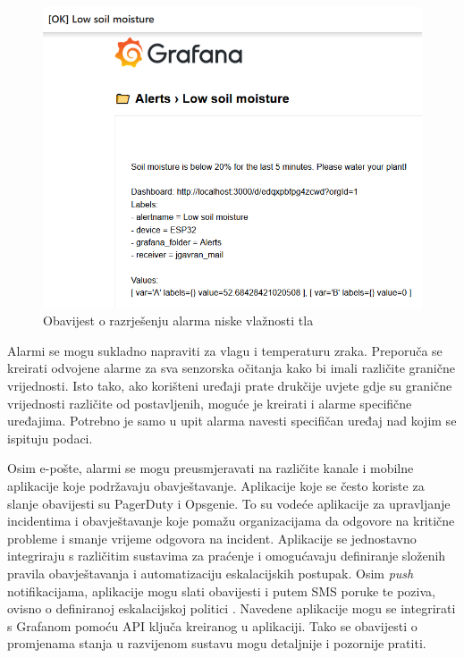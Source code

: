 \begin{figure}[ht]
	\centering
	\includegraphics[scale=0.55]{imgs/ok_low_moisture}
	\caption{Obavijest o razrješenju alarma niske vlažnosti tla}
	\label{fig:ok_low_moisture}
\end{figure}

Alarmi se mogu sukladno napraviti za vlagu i temperaturu zraka. Preporuča se kreirati odvojene alarme za sva senzorska očitanja kako bi imali različite granične vrijednosti. Isto tako, ako korišteni uređaji prate drukčije uvjete gdje su granične vrijednosti različite od postavljenih, moguće je kreirati i alarme specifične uređajima. Potrebno je samo u upit alarma navesti specifičan uređaj nad kojim se ispituju podaci. 

Osim e-pošte, alarmi se mogu preusmjeravati na različite kanale i mobilne aplikacije koje podržavaju obavještavanje. Aplikacije koje se često koriste za slanje obavijesti su PagerDuty i Opsgenie. To su vodeće aplikacije za upravljanje incidentima i obavještavanje koje pomažu organizacijama da odgovore na kritične probleme i smanje vrijeme odgovora na incident. Aplikacije se jednostavno integriraju s različitim sustavima za praćenje i omogućavaju definiranje složenih pravila obavještavanja i automatizaciju eskalacijskih postupak. Osim \textit{push} notifikacijama, aplikacije mogu slati obavijesti i putem SMS poruke te poziva, ovisno o definiranoj eskalacijskoj politici \cite{pagerduty_vs_opsgenie}. Navedene aplikacije mogu se integrirati s Grafanom pomoću API ključa kreiranog u aplikaciji. Tako se obavijesti o promjenama stanja u razvijenom sustavu mogu detaljnije i pozornije pratiti. 

\eject